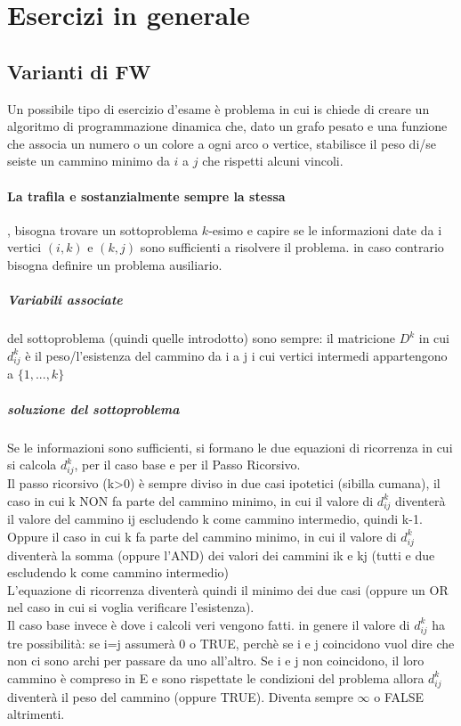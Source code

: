 \documentclass[12pt, a4paper, openany]{book}
\begin{document}
\section{Esercizi in generale}
\subsection{Varianti di FW}
Un possibile tipo di esercizio d'esame è problema in cui is chiede di creare un algoritmo di programmazione dinamica
che, dato un grafo pesato e una funzione che associa un numero o un colore a ogni arco o vertice, stabilisce {il peso di}/{se seiste} un cammino minimo da $i$ a $j$
che rispetti alcuni vincoli.
\paragraph{La trafila e sostanzialmente sempre la stessa}, bisogna trovare un sottoproblema $k$-esimo e capire se le informazioni date da i vertici $(i,k)$ e $(k,j)$
sono sufficienti a risolvere il problema. in caso contrario bisogna definire un problema ausiliario.
\subparagraph{Variabili associate} del sottoproblema (quindi quelle introdotto) sono sempre: il matricione $D^k$ in cui $d^k_{ij}$ è il peso/l'esistenza del cammino da i a j
i cui vertici intermedi appartengono a $\{1,...,k\}$
\subparagraph{soluzione del sottoproblema}
Se le informazioni sono sufficienti, si formano le due equazioni di ricorrenza in cui si calcola $d^k_{ij}$, per il caso base e per il Passo Ricorsivo.
\\Il passo ricorsivo (k>0) è sempre diviso in due casi ipotetici (sibilla cumana), il caso in cui k NON fa parte del cammino minimo, in cui il valore di $d^k_{ij}$ diventerà
il valore del cammino ij escludendo k come cammino intermedio, quindi k-1.\\Oppure il caso in cui k fa parte del cammino minimo, in cui il valore di $d^k_{ij}$ diventerà la somma (oppure l'AND) dei valori dei cammini ik e kj (tutti e due escludendo k come cammino intermedio)
\\L'equazione di ricorrenza diventerà quindi il minimo dei due casi (oppure un OR nel caso in cui si voglia verificare l'esistenza).\\
Il caso base invece è dove i calcoli veri vengono fatti. in genere il valore di $d^k_{ij}$ ha tre possibilità: se i=j assumerà 0 o TRUE, perchè se i e j coincidono vuol dire che non ci sono archi per passare da uno all'altro.
Se i e j non coincidono, il loro cammino è compreso in E e sono rispettate le condizioni del problema allora $d^k_{ij}$ diventerà il peso del cammino (oppure TRUE). Diventa sempre $\infty$ o FALSE altrimenti.
\end{document}
